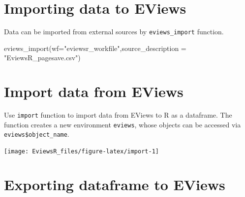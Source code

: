 \documentclass[
]{article}
\newenvironment{Shaded}{\begin{snugshade}}{\end{snugshade}}
\newcommand{\AttributeTok}[1]{\textcolor[rgb]{0.77,0.63,0.00}{#1}}
\newcommand{\FunctionTok}[1]{\textcolor[rgb]{0.00,0.00,0.00}{#1}}
\newcommand{\NormalTok}[1]{#1}
\newcommand{\SpecialCharTok}[1]{\textcolor[rgb]{0.00,0.00,0.00}{#1}}
\newcommand{\StringTok}[1]{\textcolor[rgb]{0.31,0.60,0.02}{#1}}
\begin{document}
\hypertarget{importing-data-to-eviews}{%
\section{Importing data to EViews}\label{importing-data-to-eviews}}

Data can be imported from external sources by \texttt{eviews\_import} function.

\begin{Shaded}
\begin{Highlighting}[]
\FunctionTok{eviews\_import}\NormalTok{(}\AttributeTok{wf=}\StringTok{"eviewsr\_workfile"}\NormalTok{,}\AttributeTok{source\_description =} \StringTok{"EviewsR\_pagesave.csv"}\NormalTok{)}
\end{Highlighting}
\end{Shaded}

\hypertarget{import-data-from-eviews}{%
\section{Import data from EViews}\label{import-data-from-eviews}}

Use \texttt{import} function to import data from EViews to R as a dataframe. The function creates a new environment \texttt{eviews}, whose objects can be accessed via \texttt{eviews\$object\_name}.

\begin{Shaded}
\end{Shaded}

\texttt{[image: EviewsR\_files/figure-latex/import-1]}

\hypertarget{exporting-dataframe-to-eviews}{%
\section{Exporting dataframe to EViews}\label{exporting-dataframe-to-eviews}}
\end{document}
